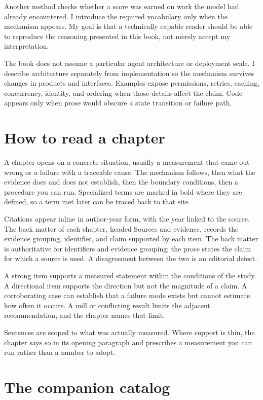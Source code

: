 Another method checks whether a score was earned on work the model had already encountered. I introduce the required vocabulary only when the mechanism appears. My goal is that a technically capable reader should be able to reproduce the reasoning presented in this book, not merely accept my interpretation.

The book does not assume a particular agent architecture or deployment scale. I describe architecture separately from implementation so the mechanism survives changes in products and interfaces. Examples expose permissions, retries, caching, concurrency, identity, and ordering when those details affect the claim. Code appears only when prose would obscure a state transition or failure path.

\section{How to read a chapter}\label{how-to-read-a-chapter}

A chapter opens on a concrete situation, usually a measurement that came out wrong or a failure with a traceable cause. The mechanism follows, then what the evidence does and does not establish, then the boundary conditions, then a procedure you can run. Specialized terms are marked in bold where they are defined, so a term met later can be traced back to that site.

Citations appear inline in author-year form, with the year linked to the source. The back matter of each chapter, headed Sources and evidence, records the evidence grouping, identifier, and claim supported by each item. The back matter is authoritative for identifiers and evidence grouping; the prose states the claim for which a source is used. A disagreement between the two is an editorial defect.

A strong item supports a measured statement within the conditions of the study. A directional item supports the direction but not the magnitude of a claim. A corroborating case can establish that a failure mode exists but cannot estimate how often it occurs. A null or conflicting result limits the adjacent recommendation, and the chapter names that limit.

Sentences are scoped to what was actually measured. Where support is thin, the chapter says so in its opening paragraph and prescribes a measurement you can run rather than a number to adopt.

\section{The companion catalog}\label{the-companion-catalog}

